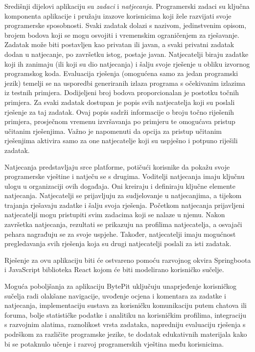 		Središnji dijelovi aplikaciju su \emph{zadaci} i \emph{natjecanja}. Programerski zadaci su ključna komponenta aplikacije i pružaju izazove korisnicima koji žele razvijati svoje programerske sposobnosti. Svaki zadatak dolazi s nazivom, jedinstvenim opisom, brojem bodova koji se mogu osvojiti i vremenskim ograničenjem za rješavanje. Zadatak može biti postavljen kao privatan ili javan, a svaki privatni zadatak dodan u natjecanje, po završetku istog, postaje javan. Natjecatelji biraju zadatke koji ih zanimaju (ili koji su dio natjecanja) i šalju svoje rješenje u obliku izvornog programskog koda. Evaluacija rješenja (omogućena samo za jedan programski jezik) temelji se na usporedbi generiranih izlaza programa s očekivanim izlazima iz testnih primjera. Dodijeljeni broj bodova proporcionalan je postotku točnih primjera. Za svaki zadatak dostupan je popis svih natjecatelja koji su poslali rješenje za taj zadatak. Ovaj popis sadrži informacije o broju točno riješenih primjera, prosječnom vremenu izvršavanja po primjeru te omogućava pristup učitanim rješenjima. Važno je napomenuti da opcija za pristup učitanim rješenjima aktivira samo za one natjecatelje koji su uspješno i potpuno riješili zadatak.
		
		Natjecanja predstavljaju srce platforme, potičući korisnike da pokažu svoje programerske vještine i natječu se s drugima. Voditelji natjecanja imaju ključnu ulogu u organizaciji ovih događaja. Oni kreiraju i definiraju ključne elemente natjecanja. Natjecatelji se prijavljuju za sudjelovanje u natjecanjima, a tijekom trajanja rješavaju zadatke i šalju svoja rješenja. Početkom natjecanja prijavljeni natjecatelji mogu pristupiti svim zadacima koji se nalaze u njemu. Nakon završetka natjecanja, rezultati se prikazuju na profilima natjecatelja, a osvajači pehara nagrađuju se za svoje uspjehe. Također, natjecatelji imaju mogućnost pregledavanja svih rješenja koja su drugi natjecatelji poslali za isti zadatak.
		
		Rješenje za ovu aplikaciju biti će ostvareno pomoću razvojnog okvira Springboota i JavaScript biblioteka React kojom će biti modelirano korisničko sučelje.
		
		Moguća poboljšanja za aplikaciju BytePit uključuju unaprjeđenje korisničkog sučelja radi olakšane navigacije, uvođenje ocjena i komentara za zadatke i natjecanja, implementaciju sustava za korisničku komunikaciju putem chatova ili foruma, bolje statističke podatke i analitiku na korisničkim profilima, integraciju s razvojnim alatima, raznolikost vrsta zadataka, napredniju evaluaciju rješenja s podrškom za različite programske jezike, te dodatak edukativnih materijala kako bi se potaknulo učenje i razvoj programerskih vještina među korisnicima. 
		
